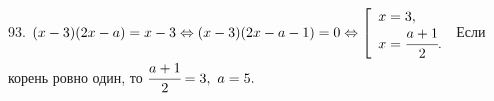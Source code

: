 93. $(x-3)(2x-a)=x-3\Leftrightarrow(x-3)(2x-a-1)=0\Leftrightarrow \left[\begin{array}{l}x=3,\\ x=\cfrac{a+1}{2}.\end{array}\right.$
Если корень ровно один, то $\cfrac{a+1}{2}=3,\ a=5.$\\
